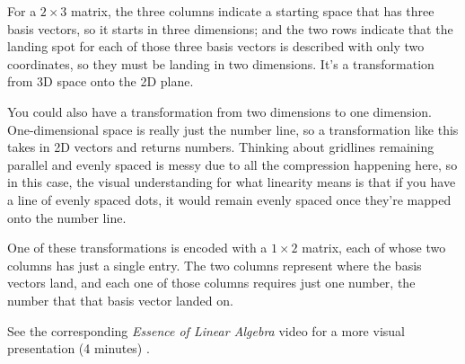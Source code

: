 For a $2 \times 3$ matrix, the three columns indicate a starting space that has
three basis vectors, so it starts in three dimensions; and the two rows indicate
that the landing spot for each of those three basis vectors is described with
only two coordinates, so they must be landing in two dimensions. It's a
transformation from 3D space onto the 2D plane.

You could also have a transformation from two dimensions to one dimension.
One-dimensional space is really just the number line, so a transformation like
this takes in 2D vectors and returns numbers. Thinking about gridlines remaining
parallel and evenly spaced is messy due to all the compression happening here,
so in this case, the visual understanding for what linearity means is that if
you have a line of evenly spaced dots, it would remain evenly spaced once
they're mapped onto the number line.

One of these transformations is encoded with a $1 \times 2$ matrix, each of
whose two columns has just a single entry. The two columns represent where the
basis vectors land, and each one of those columns requires just one number, the
number that that basis vector landed on.

\begin{remark}
  See the corresponding \textit{Essence of Linear Algebra} video for a more
  visual presentation (4 minutes)
  \cite{bib:linalg_nonsquare_matrices_as_transformations_between_dimensions}.
\end{remark}
